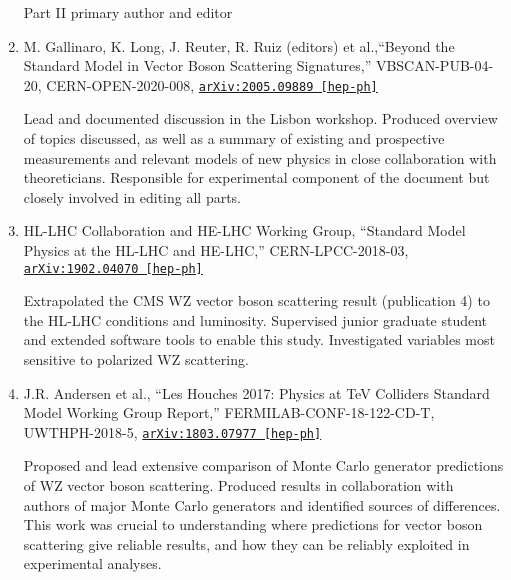 \documentclass[10pt]{res} %
\begin{document}
\begin{resume}
\begin{enumerate}
    Part II primary author and editor
  \item M. Gallinaro, K. Long, J. Reuter, R. Ruiz (editors) et al.,``Beyond the Standard Model in Vector Boson Scattering Signatures,''
    VBSCAN-PUB-04-20, CERN-OPEN-2020-008, \href{https://arxiv.org/abs/2005.09889}{\texttt{arXiv:2005.09889 [hep-ph]}}

    Lead and documented discussion in the Lisbon workshop.
    Produced overview of topics discussed, as well as a summary of existing and prospective measurements and relevant models of new physics in 
    close collaboration with theoreticians. 
    Responsible for experimental component of the document but closely involved in editing all parts.
  \item HL-LHC Collaboration and HE-LHC Working Group, ``Standard Model Physics at the HL-LHC and HE-LHC,''
    CERN-LPCC-2018-03, \href{https://arxiv.org/abs/1902.04070}{\texttt{arXiv:1902.04070 [hep-ph]}}

    Extrapolated the CMS WZ vector boson scattering result (publication 4) to the HL-LHC conditions and luminosity. Supervised junior
    graduate student and extended software tools to enable this study. Investigated variables most sensitive to 
    polarized WZ scattering.
  \item J.R. Andersen et al., ``Les Houches 2017: Physics at TeV Colliders Standard Model Working Group Report,''
    FERMILAB-CONF-18-122-CD-T, UWTHPH-2018-5, \href{https://arxiv.org/abs/1803.07977}{\texttt{arXiv:1803.07977 [hep-ph]}}

    Proposed and lead extensive comparison of Monte Carlo generator predictions of WZ vector boson scattering.
    Produced results in collaboration with authors of major Monte Carlo generators and identified sources of differences.
    This work was crucial to understanding where predictions for vector boson scattering give reliable results,
    and how they can be reliably exploited in experimental analyses.
\end{enumerate}

\end{resume}
\end{document}
